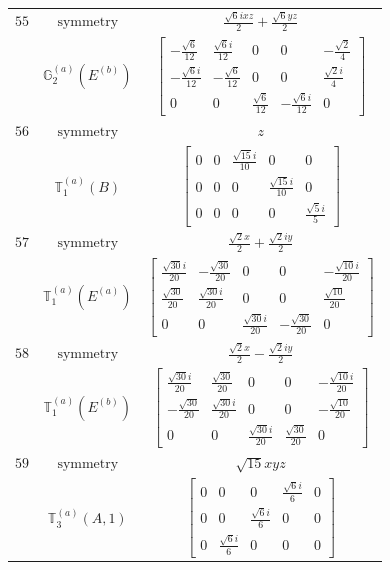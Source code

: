 \documentclass[fleqn,8pt,landscape]{jsarticle}
\begin{document}
\begin{longtable}{ccc}
$ 55 $ & $ \text{symmetry} $ & $ \frac{\sqrt{6} i x z}{2} + \frac{\sqrt{6} y z}{2} $ \\
$  $ & $ \mathbb{G}_{2}^{(a)}(E^{(b)}) $ & $ \begin{bmatrix} - \frac{\sqrt{6}}{12} & \frac{\sqrt{6} i}{12} & 0 & 0 & - \frac{\sqrt{2}}{4} \\ - \frac{\sqrt{6} i}{12} & - \frac{\sqrt{6}}{12} & 0 & 0 & \frac{\sqrt{2} i}{4} \\ 0 & 0 & \frac{\sqrt{6}}{12} & - \frac{\sqrt{6} i}{12} & 0 \end{bmatrix} $ \\ \hline
$ 56 $ & $ \text{symmetry} $ & $ z $ \\
$  $ & $ \mathbb{T}_{1}^{(a)}(B) $ & $ \begin{bmatrix} 0 & 0 & \frac{\sqrt{15} i}{10} & 0 & 0 \\ 0 & 0 & 0 & \frac{\sqrt{15} i}{10} & 0 \\ 0 & 0 & 0 & 0 & \frac{\sqrt{5} i}{5} \end{bmatrix} $ \\ \hline
$ 57 $ & $ \text{symmetry} $ & $ \frac{\sqrt{2} x}{2} + \frac{\sqrt{2} i y}{2} $ \\
$  $ & $ \mathbb{T}_{1}^{(a)}(E^{(a)}) $ & $ \begin{bmatrix} \frac{\sqrt{30} i}{20} & - \frac{\sqrt{30}}{20} & 0 & 0 & - \frac{\sqrt{10} i}{20} \\ \frac{\sqrt{30}}{20} & \frac{\sqrt{30} i}{20} & 0 & 0 & \frac{\sqrt{10}}{20} \\ 0 & 0 & \frac{\sqrt{30} i}{20} & - \frac{\sqrt{30}}{20} & 0 \end{bmatrix} $ \\ \hline
$ 58 $ & $ \text{symmetry} $ & $ \frac{\sqrt{2} x}{2} - \frac{\sqrt{2} i y}{2} $ \\
$  $ & $ \mathbb{T}_{1}^{(a)}(E^{(b)}) $ & $ \begin{bmatrix} \frac{\sqrt{30} i}{20} & \frac{\sqrt{30}}{20} & 0 & 0 & - \frac{\sqrt{10} i}{20} \\ - \frac{\sqrt{30}}{20} & \frac{\sqrt{30} i}{20} & 0 & 0 & - \frac{\sqrt{10}}{20} \\ 0 & 0 & \frac{\sqrt{30} i}{20} & \frac{\sqrt{30}}{20} & 0 \end{bmatrix} $ \\ \hline
$ 59 $ & $ \text{symmetry} $ & $ \sqrt{15} x y z $ \\
$  $ & $ \mathbb{T}_{3}^{(a)}(A,1) $ & $ \begin{bmatrix} 0 & 0 & 0 & \frac{\sqrt{6} i}{6} & 0 \\ 0 & 0 & \frac{\sqrt{6} i}{6} & 0 & 0 \\ 0 & \frac{\sqrt{6} i}{6} & 0 & 0 & 0 \end{bmatrix} $ \\ \hline

\end{longtable}
\end{document}
